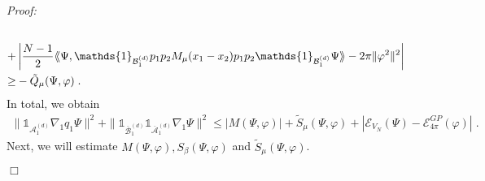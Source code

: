 \documentclass[11pt, english, american]{article}
\newcommand{\laa}{\langle\hspace{-0.08cm}\langle}
\newcommand{\raa}{\rangle\hspace{-0.08cm}\rangle}
\newenvironment{proof}{\emph{Proof:}}{\begin{flushright} $ \Box $ \end{flushright}}
\renewcommand{\phi}{\varphi}
\begin{document}
\begin{proof}
\begin{align}
\\
\label{vielezeilenc}
+&
\left|
\frac{N-1}{2}\laa\Psi ,\mathds{1}_{\mathcal{B}^{(d)}_{1}}p_1p_2M_{\mu}(x_1-x_2)p_1p_2\mathds{1}_{\mathcal{B}^{(d)}_{1}}\Psi\raa -2\pi\|\phi^2\|^2
\right|
\\
\nonumber
\geq& -\tilde{Q}_\mu (\Psi, \phi)
 \;.
\end{align}
In total, we obtain
\begin{align}
\label{secondenergybound}
 \|\mathds{1}_{\mathcal{A}^{(d)}_{1}}\nabla_1q_1\Psi \|^2
 +
 \|\mathds{1}_{\overline{\mathcal{B}}^{(d)}_{1}}
\mathds{1}_{\overline{\mathcal{A}}^{(d)}_{1}}
\nabla_1\Psi \|^2
\leq
|M( \Psi, \phi)|+\tilde{S}_\mu( \Psi, \phi)+ \left|\mathcal{E}_{V_N}(\Psi)-\mathcal{E}_{4 \pi}^{GP}(\phi)\right|
\;.
 \end{align}
Next, we will estimate $M( \Psi, \phi),S_\beta( \Psi, \phi)$ and $\tilde{S}_\mu( \Psi, \phi)$.



\end{proof}
\end{document}
